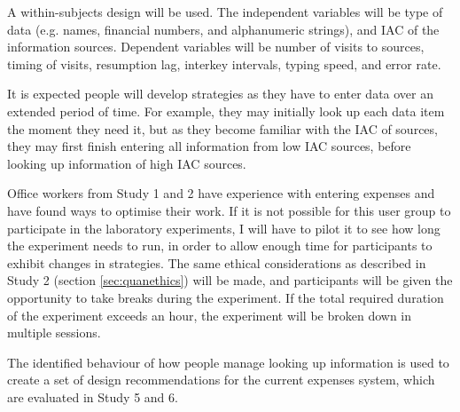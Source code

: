 \documentclass[11pt,oneside]{report}
\begin{document}
\begin{table}
A within-subjects design will be used. The independent variables will be type of data (e.g. names, financial numbers, and alphanumeric strings), and IAC of the information sources. Dependent variables will be number of visits to sources, timing of visits, resumption lag, interkey intervals, typing speed, and error rate.

It is expected people will develop strategies as they have to enter data over an extended period of time. 
For example, they may initially look up each data item the moment they need it, but as they become familiar with the IAC of sources, they may first finish entering all information from low IAC sources, before looking up information of high IAC sources. 

Office workers from Study 1 and 2 have experience with entering expenses and have found ways to optimise their work. If it is not possible for this user group to participate in the laboratory experiments, I will have to pilot it to see how long the experiment needs to run, in order to allow enough time for participants to exhibit changes in strategies. The same ethical considerations as described in Study 2 (section \ref{sec:quanethics}) will be made, and participants will be given the opportunity to take breaks during the experiment. If the total required duration of the experiment exceeds an hour, the experiment will be broken down in multiple sessions.

The identified behaviour of how people manage looking up information is used to create a set of design recommendations for the current expenses system, which are evaluated in Study 5 and 6.


\end{table}
\end{document}
